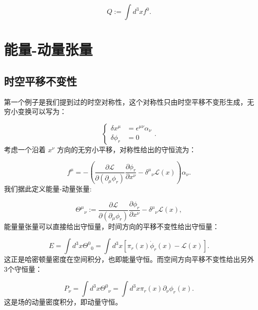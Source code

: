 \documentclass[10pt,UTF8]{ctexart}
\begin{document}
\begin{equation}
Q:=\int d^{3}xf^{0}.
\end{equation}


\section*{能量-动量张量 }

\subsection*{时空平移不变性}
\noindent
第一个例子是我们提到过的时空对称性，这个对称性只由时空平移不变形生成，无穷小变换可以写为： 

\begin{equation}
\begin{cases}
\delta x^{\mu} & =\epsilon^{\mu\nu}\alpha_{\nu}\\
\delta\phi_{r} & =0
\end{cases}.
\end{equation}
考虑一个沿着 $x^{\nu}$ 方向的无穷小平移，对称性给出的守恒流为： 

\begin{equation}
f^{\mu}=-\left(\frac{\partial\mathcal{L}}{\partial\left(\partial_{\mu}\phi_{r}\right)}\frac{\partial\phi_{r}}{\partial x^{\nu}}-{\delta^{\mu}}_{\nu}\mathcal{L}\left(x\right)\right)\alpha_{\nu}.
\end{equation}
我们据此定义能量-动量张量: 

\begin{equation}
{\Theta^{\mu}}_{\nu}:=\frac{\partial\mathcal{L}}{\partial\left(\partial_{\mu}\phi_{r}\right)}\frac{\partial\phi_{r}}{\partial x^{\nu}}-{\delta^{\mu}}_{\nu}\mathcal{L}\left(x\right),
\end{equation}
能量量张量可以直接给出守恒量，时间方向的平移不变性给出守恒量： 

\begin{equation}
E=\int d^{3}x{\Theta^{0}}_{0}=\int d^{3}x\left[\pi_{r}\left(x\right)\dot{\phi}_{r}\left(x\right)-\mathcal{L}\left(x\right)\right].
\end{equation}
这正是哈密顿量密度在空间积分，也即能量守恒。而空间方向平移不变性给出另外3个守恒量： 

\begin{equation}
P_{\nu}=\int d^{3}x{\Theta^{0}}_{\nu}=\int d^{3}x\pi_{r}\left(x\right)\partial_{\nu}\phi_{r}\left(x\right).
\end{equation}
这是场的动量密度积分，即动量守恒。 
\end{document}
